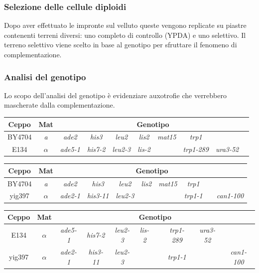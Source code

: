 		\subsubsection*{Selezione delle cellule diploidi}
		Dopo aver effettuato le impronte sul velluto queste vengono replicate su piastre contenenti terreni diversi: uno completo di controllo (YPDA) e uno selettivo. 
		Il terreno selettivo viene scelto in base al genotipo per sfruttare il fenomeno di complementazione.

		\subsubsection{Analisi del genotipo}
		Lo scopo dell'analisi del genotipo \`e evidenziare auxotrofie che verrebbero mascherate dalla complementazione.
		\begin{center}
			\begin{tabular}{|c|c|c|c|c|c|c|c|c|c|}
				\hline
				Ceppo & Mat & \multicolumn{8}{c|}{Genotipo}\\
				\hline
				BY4704 & \emph{a} & \emph{ade2} & \emph{his3} & \emph{leu2} & \emph{lis2} & \emph{mat15} & \emph{trp1} & & \\
				\hline
				E134 & $\alpha$ & \emph{ade5-1} & \emph{his7-2} & \emph{leu2-3} & \emph{lis-2} & & \emph{trp1-289} & \emph{ura3-52} & \\
				\hline
			\end{tabular}
		\end{center}
		\begin{center}
			\begin{tabular}{|c|c|c|c|c|c|c|c|c|c|}
				\hline
				Ceppo & Mat & \multicolumn{8}{c|}{Genotipo}\\
				\hline
				BY4704 & \emph{a} & \emph{ade2} & \emph{his3} & \emph{leu2} & \emph{lis2} & \emph{mat15} & \emph{trp1} & & \\
				\hline
				yig397 & $\alpha$ & \emph{ade2-1} & \emph{his3-11} & \emph{leu2-3} & & & \emph{trp1-1} & & \emph{can1-100}\\
				\hline
			\end{tabular}
		\end{center}
		\begin{center}
			\begin{tabular}{|c|c|c|c|c|c|c|c|c|c|}
				\hline
				Ceppo & Mat & \multicolumn{8}{c|}{Genotipo}\\
				\hline
				E134 & $\alpha$ & \emph{ade5-1} & \emph{his7-2} & \emph{leu2-3} & \emph{lis-2} & & \emph{trp1-289} & \emph{ura3-52} & \\
				\hline
				yig397 & $\alpha$ & \emph{ade2-1} & \emph{his3-11} & \emph{leu2-3} & & & \emph{trp1-1} & & \emph{can1-100}\\
				\hline
			\end{tabular}
		\end{center}


